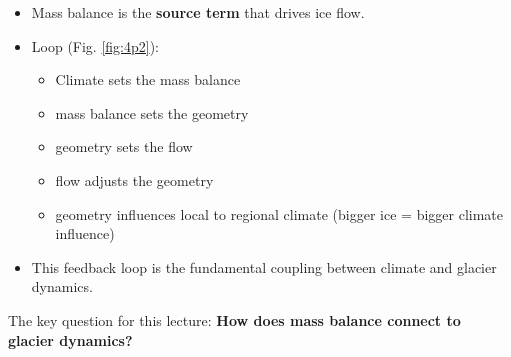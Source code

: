 \documentclass[11pt]{article}
\begin{document}
\begin{itemize}
  \item Mass balance is the \textbf{source term} that drives ice flow.
  \item Loop (Fig. \ref{fig:4p2}):
  \begin{itemize}
  	\item Climate sets the mass balance
	\item mass balance sets the geometry
	\item geometry sets the flow
	\item flow adjusts the geometry
	\item geometry influences local to regional climate (bigger ice = bigger climate influence)
 \end{itemize}
  \item This feedback loop is the fundamental coupling between climate and glacier dynamics. 
\end{itemize}



The key question for this lecture: \textbf{How does mass balance connect to glacier dynamics?}
\end{document}
